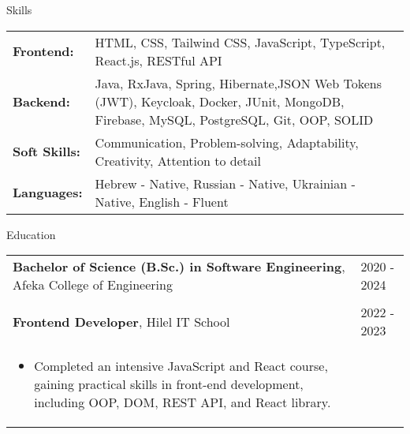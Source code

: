 \documentclass{resume}
\begin{document}
\vspace{5pt}


\begin{rSection}{Skills}

\begin{tabularx}{\textwidth}{@{}>{\textbullet\hspace{\labelsep}\bfseries}l X@{}}
\vspace{0.25em}
\hspace{\labelsep}Frontend: & HTML, CSS, Tailwind CSS, JavaScript, TypeScript, React.js, RESTful API \\
\vspace{0.25em}
\hspace{\labelsep}Backend: & Java, RxJava, Spring, Hibernate,JSON Web Tokens (JWT), Keycloak, Docker, JUnit, MongoDB, Firebase, MySQL, PostgreSQL, Git, OOP, SOLID \\
\vspace{0.25em}
\hspace{\labelsep}Soft Skills: & Communication, Problem-solving, Adaptability, Creativity, Attention to detail \\
\vspace{0.25em}
\hspace{\labelsep}Languages: & Hebrew - Native, Russian - Native, Ukrainian - Native, English - Fluent
\end{tabularx}
\end{rSection}

\vspace{5pt}
\begin{rSection}{Education}

\begin{tabular}{@{}p{}p{}}
  {\bf Bachelor of Science (B.Sc.) in Software Engineering}, Afeka College of Engineering & \hfill 2020 - 2024\hspace*{1em} \\
  & \hfill \\
  {\bf Frontend Developer}, Hilel IT School & \hfill 2022 - 2023\hspace*{1em} \\
  \begin{itemize}
      \item Completed an intensive JavaScript and React course, gaining practical skills in front-end development, including OOP, DOM, REST API, and React library.
  \end{itemize}
\end{tabular}

\end{rSection}
\end{document}
